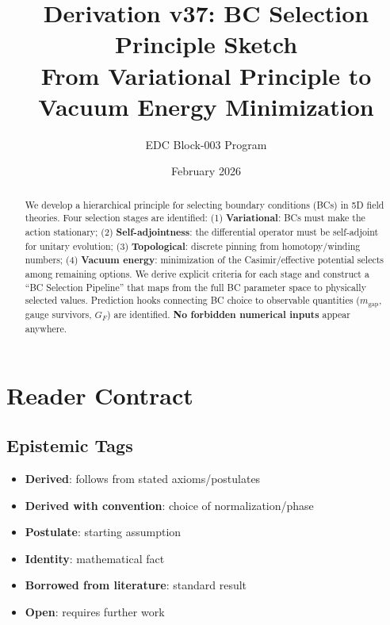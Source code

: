 \documentclass[11pt,a4paper]{article}
\title{\textbf{Derivation v37: BC Selection Principle Sketch} \\[0.5em]
\large From Variational Principle to Vacuum Energy Minimization}
\author{EDC Block-003 Program}
\date{February 2026}
\newcommand{\tagD}{\textcolor{blue!70!black}{[D]}}
\newcommand{\tagDc}{\textcolor{blue!50!black}{[Dc]}}
\newcommand{\tagP}{\textcolor{green!50!black}{[P]}}
\newcommand{\tagI}{\textcolor{gray}{[I]}}
\newcommand{\tagBL}{\textcolor{purple}{[BL]}}
\newcommand{\tagOPEN}{\textcolor{red!70!black}{[OPEN]}}
\begin{document}
\maketitle

\begin{abstract}
We develop a hierarchical principle for selecting boundary conditions (BCs) in
5D field theories. Four selection stages are identified: (1) \textbf{Variational}:
BCs must make the action stationary; (2) \textbf{Self-adjointness}: the differential
operator must be self-adjoint for unitary evolution; (3) \textbf{Topological}:
discrete pinning from homotopy/winding numbers; (4) \textbf{Vacuum energy}:
minimization of the Casimir/effective potential selects among remaining options.
We derive explicit criteria for each stage and construct a ``BC Selection Pipeline''
that maps from the full BC parameter space to physically selected values.
Prediction hooks connecting BC choice to observable quantities ($m_{\text{gap}}$,
gauge survivors, $G_F$) are identified. \textbf{No forbidden numerical inputs}
appear anywhere.
\end{abstract}

\tableofcontents
\newpage

\section{Reader Contract}

\subsection{Epistemic Tags}
\begin{itemize}[leftmargin=2cm]
    \item[\tagD] \textbf{Derived}: follows from stated axioms/postulates
    \item[\tagDc] \textbf{Derived with convention}: choice of normalization/phase
    \item[\tagP] \textbf{Postulate}: starting assumption
    \item[\tagI] \textbf{Identity}: mathematical fact
    \item[\tagBL] \textbf{Borrowed from literature}: standard result
    \item[\tagOPEN] \textbf{Open}: requires further work
\end{itemize}
\end{document}
